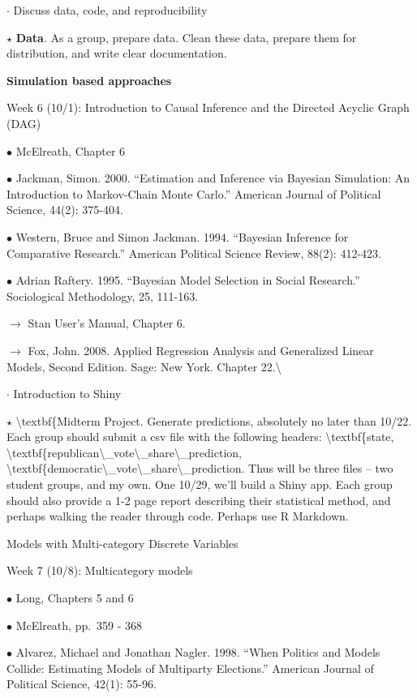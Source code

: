 \documentclass[
]{book}
\begin{document}
\(\cdot\) Discuss data, code, and reproducibility

\(\star\) \textbf{Data}. As a group, prepare data. Clean these data, prepare them for distribution, and write clear documentation.

\textbf{Simulation based approaches}

Week 6 (10/1): Introduction to Causal Inference and the Directed Acyclic Graph (DAG)

\(\bullet\) McElreath, Chapter 6

\(\bullet\) Jackman, Simon. 2000. ``Estimation and Inference via Bayesian Simulation: An Introduction to Markov-Chain Monte Carlo.'' American Journal of Political Science, 44(2): 375-404.

\(\bullet\) Western, Bruce and Simon Jackman. 1994. ``Bayesian Inference for Comparative Research.'' American Political Science Review, 88(2): 412-423.

\(\bullet\) Adrian Raftery. 1995. ``Bayesian Model Selection in Social Research.'' Sociological Methodology, 25, 111-163.

\(\rightarrow\) Stan User's Manual, Chapter 6.

\(\rightarrow\) Fox, John. 2008. Applied Regression Analysis and Generalized Linear Models, Second Edition. Sage: New York. Chapter 22.\textbackslash{}

\(\cdot\) Introduction to Shiny

\(\star\) \textbackslash textbf\{Midterm Project. Generate predictions, absolutely no later than 10/22. Each group should submit a csv file with the following headers: \textbackslash textbf\{state, \textbackslash textbf\{republican\textbackslash\_vote\textbackslash\_share\textbackslash\_prediction, \textbackslash textbf\{democratic\textbackslash\_vote\textbackslash\_share\textbackslash\_prediction. Thus will be three files -- two student groups, and my own. One 10/29, we'll build a Shiny app. Each group should also provide a 1-2 page report describing their statistical method, and perhaps walking the reader through code. Perhaps use R Markdown.

Models with Multi-category Discrete Variables

Week 7 (10/8): Multicategory models

\(\bullet\) Long, Chapters 5 and 6

\(\bullet\) McElreath, pp.~359 - 368

\(\bullet\) Alvarez, Michael and Jonathan Nagler. 1998. ``When Politics and Models Collide: Estimating Models of Multiparty Elections.'' American Journal of Political Science, 42(1): 55-96.
\end{document}

